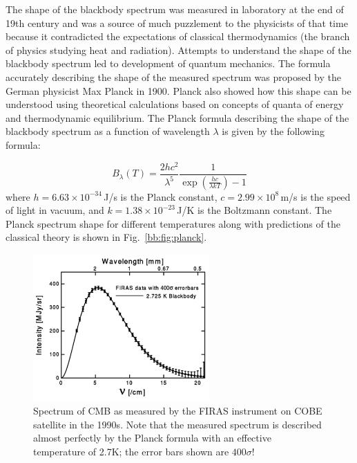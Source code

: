 The shape of the blackbody spectrum was measured in laboratory at the end of 19th century and was a source of much puzzlement to the physicists of that time because it contradicted the expectations of classical thermodynamics (the branch of physics studying heat and radiation). Attempts to understand the shape of the blackbody spectrum led to development of quantum mechanics. The formula accurately describing the shape of the measured spectrum was proposed by the German physicist Max Planck in 1900. Planck also showed how this shape can be understood using theoretical calculations based on concepts of quanta of energy and thermodynamic equilibrium. The Planck formula describing the shape of the blackbody spectrum as a function of wavelength $\lambda$ is given by the following formula:

\begin{equation}\label{bb:eq:planck}
B_\lambda (T) = \frac{2 h c^2}{\lambda^5} \frac{1}{\exp(\frac{h c}{\lambda k T}) - 1}
\end{equation}
where $h=6.63\times10^{-34}\,$J/s is the Planck constant, $c=2.99\times 10^8\,$m/s is the speed of light in vacuum, and $k=1.38\times 10^{-23}\,$J/K is the Boltzmann constant.  The Planck spectrum shape for different temperatures along with predictions of the classical theory is shown in Fig.~\ref{bb:fig:planck}.%

\begin{figure}[htb]
	\begin{center}
		\includegraphics[angle=0,width=0.6\textwidth]{blackbody/firas_spectrum.pdf}
		\caption{Spectrum of CMB as measured by the FIRAS instrument on COBE satellite in the 1990s. Note that the measured spectrum is described almost perfectly by the Planck formula with an effective temperature of 2.7K; the error bars shown are $400 \sigma$!}\label{bb:fig:cobe}
	\end{center}
\end{figure}

